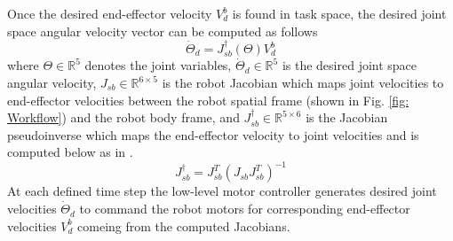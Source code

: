 \documentclass[letterpaper, 10 pt, conference]{ieeeconf}  %
\begin{document}
Once the desired end-effector velocity $V_d^b$ is found in task space, the desired joint space angular velocity vector can be computed as follows
\begin{equation} %
\Dot{\Theta}_d = J_{sb}^\dagger(\Theta)V_d^b 
\label{eq: joint_velocities}
\end{equation}
where $\Theta \in \mathbb{R}^5$ denotes the joint variables, $\dot{\Theta}_d \in \mathbb{R}^5$ is the desired joint space angular velocity, $J_{sb}\in \mathbb{R}^{6 \times 5}$ is the robot Jacobian which maps joint velocities to end-effector velocities between the robot spatial frame (shown in Fig. \ref{fig: Workflow}) and the robot body frame, and $J^{\dagger}_{sb}\in \mathbb{R}^{5 \times 6}$ is the Jacobian pseudoinverse which maps the end-effector velocity to joint velocities and is computed below as in \cite{chiacchio1991closed}.
\begin{equation}
J^{\dagger}_{sb} = J^T_{sb}(J_{sb}J^T_{sb})^{-1}
\label{eq: Jscobian_pseudo_inverse}    
\end{equation}
At each defined time step the low-level motor controller generates desired joint velocities $\dot{\Theta}_d$ to command the robot motors for corresponding end-effector velocities $V_d^b$ comeing from the computed Jacobians.  


\end{document}
